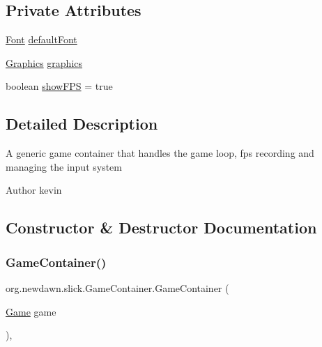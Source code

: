 \subsection*{Private Attributes}
\begin{DoxyCompactItemize}
\item 
\mbox{\hyperlink{interfaceorg_1_1newdawn_1_1slick_1_1_font}{Font}} \mbox{\hyperlink{classorg_1_1newdawn_1_1slick_1_1_game_container_a42d2acd12fa335270fdea3fd9d739d55}{default\+Font}}
\item 
\mbox{\hyperlink{classorg_1_1newdawn_1_1slick_1_1_graphics}{Graphics}} \mbox{\hyperlink{classorg_1_1newdawn_1_1slick_1_1_game_container_ab33d45e90ae9dcfcfd9c7a907415a58b}{graphics}}
\item 
boolean \mbox{\hyperlink{classorg_1_1newdawn_1_1slick_1_1_game_container_a21f562c31b09838dbfb2f21048f093c6}{show\+F\+PS}} = true
\end{DoxyCompactItemize}


\subsection{Detailed Description}
A generic game container that handles the game loop, fps recording and managing the input system

\begin{DoxyAuthor}{Author}
kevin 
\end{DoxyAuthor}


\subsection{Constructor \& Destructor Documentation}
\mbox{\label{classorg_1_1newdawn_1_1slick_1_1_game_container_add5e3083ba4b2604c99fe30c3a022cfb}} 
\subsubsection{\texorpdfstring{Game\+Container()}{GameContainer()}}
{\footnotesize\ttfamily org.\+newdawn.\+slick.\+Game\+Container.\+Game\+Container (\begin{DoxyParamCaption}\item[{\mbox{\hyperlink{interfaceorg_1_1newdawn_1_1slick_1_1_game}{Game}}}]{game }\end{DoxyParamCaption})\hspace{0.3cm}{\ttfamily [inline]}, {\ttfamily [protected]}}

